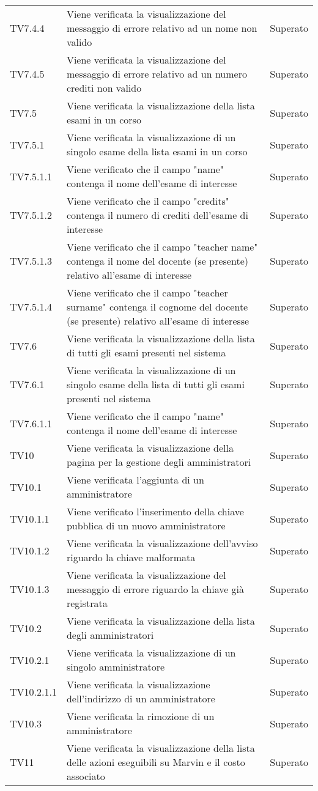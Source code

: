 \documentclass[PianoDiQualifica.tex]{subfiles}
\begin{document}
\begin{longtable}[H]{P{2cm}P{8.5cm}P{3cm}}
	TV7.4.4 & Viene verificata la visualizzazione del messaggio di errore relativo ad un nome non valido & Superato \\ 
	TV7.4.5 & Viene verificata la visualizzazione del messaggio di errore relativo ad un numero crediti non valido & Superato \\ 
	TV7.5 & Viene verificata la visualizzazione della lista esami in un corso & Superato \\ 
	TV7.5.1 & Viene verificata la visualizzazione di un singolo esame della lista esami in un corso & Superato \\ 
	TV7.5.1.1 & Viene verificato che il campo "name" contenga il nome dell'esame di interesse & Superato \\ 
	TV7.5.1.2 & Viene verificato che il campo "credits" contenga il numero di crediti dell'esame di interesse & Superato \\ 
	TV7.5.1.3 & Viene verificato che il campo "teacher name" contenga il nome del docente (se presente) relativo all'esame di interesse & Superato \\ 
	TV7.5.1.4 & Viene verificato che il campo "teacher surname" contenga il cognome del docente (se presente) relativo all'esame di interesse & Superato \\ 
	TV7.6 & Viene verificata la visualizzazione della lista di tutti gli esami presenti nel sistema & Superato \\ 
	TV7.6.1 & Viene verificata la visualizzazione di un singolo esame della lista di tutti gli esami presenti nel sistema & Superato \\ 
	TV7.6.1.1 & Viene verificato che il campo "name" contenga il nome dell'esame di interesse & Superato \\ 
	TV10 & Viene verificata la visualizzazione della pagina per la gestione degli amministratori & Superato \\ 
	TV10.1 & Viene verificata l'aggiunta di un amministratore & Superato \\ 
	TV10.1.1 & Viene verificato l'inserimento della chiave pubblica di un nuovo amministratore & Superato \\ 
	TV10.1.2 & Viene verificata la visualizzazione dell'avviso riguardo la chiave malformata & Superato \\ 
	TV10.1.3 & Viene verificata la visualizzazione del messaggio di errore riguardo la chiave già registrata & Superato \\ 
	TV10.2 & Viene verificata la visualizzazione della lista degli amministratori & Superato \\ 
	TV10.2.1 & Viene verificata la visualizzazione di un singolo amministratore & Superato \\ 
	TV10.2.1.1 & Viene verificata la visualizzazione dell'indirizzo di un amministratore & Superato \\ 
	TV10.3 & Viene verificata la rimozione di un amministratore & Superato \\ 
	TV11 & Viene verificata la visualizzazione della lista delle azioni eseguibili su Marvin e il costo associato & Superato \\ 


\end{longtable}
\end{document}
